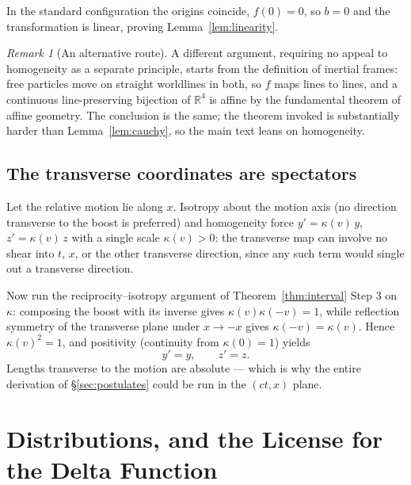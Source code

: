 \documentclass[11pt]{article}
\theoremstyle{plain}
\theoremstyle{definition}
\theoremstyle{remark}
\newtheorem{remark}[theorem]{Remark}
\newcommand{\R}{\mathbb{R}}
\begin{document}
\noindent
In the standard configuration the origins coincide, $f(0) = 0$, so $b=0$
and the transformation is linear, proving Lemma~\ref{lem:linearity}.

\begin{remark}[An alternative route]
A different argument, requiring no appeal to homogeneity as a separate
principle, starts from the definition of inertial frames: free particles
move on straight worldlines in both, so $f$ maps lines to lines, and a
continuous line-preserving bijection of $\R^4$ is affine by the
fundamental theorem of affine geometry. The conclusion is the same; the
theorem invoked is substantially harder than Lemma~\ref{lem:cauchy}, so
the main text leans on homogeneity.
\end{remark}

\subsection{The transverse coordinates are spectators}

Let the relative motion lie along $x$. Isotropy about the motion axis
(no direction transverse to the boost is preferred) and homogeneity
force $y' = \kappa(v)\,y$, $z' = \kappa(v)\,z$ with a single scale
$\kappa(v) > 0$: the transverse map can involve no shear into $t$, $x$,
or the other transverse direction, since any such term would single out a
transverse direction.

Now run the reciprocity--isotropy argument of Theorem~\ref{thm:interval}
Step 3 on $\kappa$: composing the boost with its inverse gives
$\kappa(v)\kappa(-v) = 1$, while reflection symmetry of the transverse
plane under $x \to -x$ gives $\kappa(-v) = \kappa(v)$. Hence
$\kappa(v)^2 = 1$, and positivity (continuity from $\kappa(0) = 1$)
yields
\begin{equation}
  \boxed{\; y' = y, \qquad z' = z. \;}
\end{equation}
Lengths transverse to the motion are absolute --- which is why the
entire derivation of \S\ref{sec:postulates} could be run in the
$(ct, x)$ plane.

\section{Distributions, and the License for the Delta Function}
\label{app:distributions}
\end{document}
